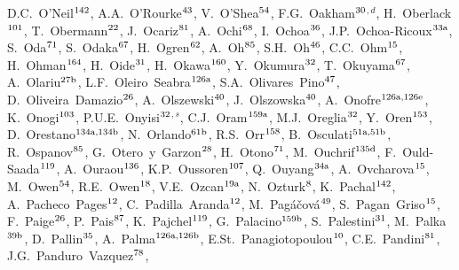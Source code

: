 \begin{flushleft}
D.C.~O'Neil$^\textrm{\scriptsize 142}$,
A.A.~O'Rourke$^\textrm{\scriptsize 43}$,
V.~O'Shea$^\textrm{\scriptsize 54}$,
F.G.~Oakham$^\textrm{\scriptsize 30}$$^{,d}$,
H.~Oberlack$^\textrm{\scriptsize 101}$,
T.~Obermann$^\textrm{\scriptsize 22}$,
J.~Ocariz$^\textrm{\scriptsize 81}$,
A.~Ochi$^\textrm{\scriptsize 68}$,
I.~Ochoa$^\textrm{\scriptsize 36}$,
J.P.~Ochoa-Ricoux$^\textrm{\scriptsize 33a}$,
S.~Oda$^\textrm{\scriptsize 71}$,
S.~Odaka$^\textrm{\scriptsize 67}$,
H.~Ogren$^\textrm{\scriptsize 62}$,
A.~Oh$^\textrm{\scriptsize 85}$,
S.H.~Oh$^\textrm{\scriptsize 46}$,
C.C.~Ohm$^\textrm{\scriptsize 15}$,
H.~Ohman$^\textrm{\scriptsize 164}$,
H.~Oide$^\textrm{\scriptsize 31}$,
H.~Okawa$^\textrm{\scriptsize 160}$,
Y.~Okumura$^\textrm{\scriptsize 32}$,
T.~Okuyama$^\textrm{\scriptsize 67}$,
A.~Olariu$^\textrm{\scriptsize 27b}$,
L.F.~Oleiro~Seabra$^\textrm{\scriptsize 126a}$,
S.A.~Olivares~Pino$^\textrm{\scriptsize 47}$,
D.~Oliveira~Damazio$^\textrm{\scriptsize 26}$,
A.~Olszewski$^\textrm{\scriptsize 40}$,
J.~Olszowska$^\textrm{\scriptsize 40}$,
A.~Onofre$^\textrm{\scriptsize 126a,126e}$,
K.~Onogi$^\textrm{\scriptsize 103}$,
P.U.E.~Onyisi$^\textrm{\scriptsize 32}$$^{,s}$,
C.J.~Oram$^\textrm{\scriptsize 159a}$,
M.J.~Oreglia$^\textrm{\scriptsize 32}$,
Y.~Oren$^\textrm{\scriptsize 153}$,
D.~Orestano$^\textrm{\scriptsize 134a,134b}$,
N.~Orlando$^\textrm{\scriptsize 61b}$,
R.S.~Orr$^\textrm{\scriptsize 158}$,
B.~Osculati$^\textrm{\scriptsize 51a,51b}$,
R.~Ospanov$^\textrm{\scriptsize 85}$,
G.~Otero~y~Garzon$^\textrm{\scriptsize 28}$,
H.~Otono$^\textrm{\scriptsize 71}$,
M.~Ouchrif$^\textrm{\scriptsize 135d}$,
F.~Ould-Saada$^\textrm{\scriptsize 119}$,
A.~Ouraou$^\textrm{\scriptsize 136}$,
K.P.~Oussoren$^\textrm{\scriptsize 107}$,
Q.~Ouyang$^\textrm{\scriptsize 34a}$,
A.~Ovcharova$^\textrm{\scriptsize 15}$,
M.~Owen$^\textrm{\scriptsize 54}$,
R.E.~Owen$^\textrm{\scriptsize 18}$,
V.E.~Ozcan$^\textrm{\scriptsize 19a}$,
N.~Ozturk$^\textrm{\scriptsize 8}$,
K.~Pachal$^\textrm{\scriptsize 142}$,
A.~Pacheco~Pages$^\textrm{\scriptsize 12}$,
C.~Padilla~Aranda$^\textrm{\scriptsize 12}$,
M.~Pag\'{a}\v{c}ov\'{a}$^\textrm{\scriptsize 49}$,
S.~Pagan~Griso$^\textrm{\scriptsize 15}$,
F.~Paige$^\textrm{\scriptsize 26}$,
P.~Pais$^\textrm{\scriptsize 87}$,
K.~Pajchel$^\textrm{\scriptsize 119}$,
G.~Palacino$^\textrm{\scriptsize 159b}$,
S.~Palestini$^\textrm{\scriptsize 31}$,
M.~Palka$^\textrm{\scriptsize 39b}$,
D.~Pallin$^\textrm{\scriptsize 35}$,
A.~Palma$^\textrm{\scriptsize 126a,126b}$,
E.St.~Panagiotopoulou$^\textrm{\scriptsize 10}$,
C.E.~Pandini$^\textrm{\scriptsize 81}$,
J.G.~Panduro~Vazquez$^\textrm{\scriptsize 78}$,

\end{flushleft}
